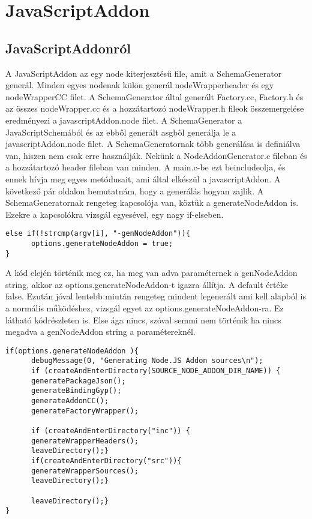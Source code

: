 \chapter{JavaScriptAddon}\label{chap:JavaScriptAddon}

\section{JavaScriptAddonról}

\noindent

A JavaScriptAddon az egy node kiterjesztésű file, amit a SchemaGenerator generál. Minden egyes nodenak külön generál nodeWrapperheader és egy nodeWrapperCC filet.
A SchemaGenerator által generált Factory.cc, Factory.h és az összes nodeWrapper.cc és a hozzátartozó nodeWrapper.h fileok összemergelése eredményezi a javascriptAddon.node filet.
A SchemaGenerator a JavaScriptSchemából és az ebből generált asgből generálja le a javascriptAddon.node filet.
A SchemaGeneratornak több generálása is definiálva van, hiszen nem csak erre használják. Nekünk a NodeAddonGenerator.c fileban és a hozzátartozó header fileban van minden.
A main.c-be ezt beincludeolja, és ennek hívja meg egyes metódusait, ami által elkészül a javascriptAddon.
A következő pár oldalon bemutatnám, hogy a generálás hogyan zajlik.
A SchemaGeneratornak rengeteg kapcsolója van, köztük a generateNodeAddon is. Ezekre a kapcsolókra vizsgál egyesével, egy nagy if-elseben.
\begin{lstlisting}[caption={SchemaGenerator kapcsoló vizsgálás},label={lst:schemagenerator_argv_genNodeAddon}, language={CStyle}]
else if(!strcmp(argv[i], "-genNodeAddon")){
      options.generateNodeAddon = true;
}
\end{lstlisting}
A kód elején történik meg ez, ha meg van adva paraméternek a genNodeAddon string, akkor az options.generateNodeAddon-t igazra állítja. A default értéke false.
Ezután jóval lentebb miután rengeteg mindent legenerált ami kell alapból is a normális működéshez, vizsgál egyet az options.generateNodeAddon-ra.
Ez látható  kódrészleten is. Else ága nincs, szóval semmi nem történik ha nincs megadva a genNodeAddon string a paramétereknél.
\begin{lstlisting}[caption={SchemaGenerator javascriptAddon generálás},label={lst:schemagenerator_genNodeAddon_check}, language={CStyle}]
if(options.generateNodeAddon ){
      debugMessage(0, "Generating Node.JS Addon sources\n");
      if (createAndEnterDirectory(SOURCE_NODE_ADDON_DIR_NAME)) {
      generatePackageJson();
      generateBindingGyp();
      generateAddonCC();
      generateFactoryWrapper();

      if (createAndEnterDirectory("inc")) {
      generateWrapperHeaders();
      leaveDirectory();}
      if(createAndEnterDirectory("src")){
      generateWrapperSources();
      leaveDirectory();}

      leaveDirectory();}
}
\end{lstlisting}

